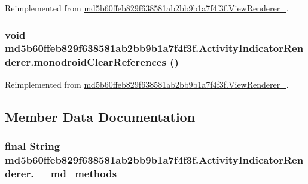 Reimplemented from \hyperlink{classmd5b60ffeb829f638581ab2bb9b1a7f4f3f_1_1_view_renderer__2_64ca8244a89f60a47c173d9c0b15d610}{md5b60ffeb829f638581ab2bb9b1a7f4f3f.ViewRenderer\_}.\hypertarget{classmd5b60ffeb829f638581ab2bb9b1a7f4f3f_1_1_activity_indicator_renderer_53c663b171496cdee3e0eca02ade7e9d}{
\subsubsection[{monodroidClearReferences}]{\setlength{\rightskip}{0pt plus 5cm}void md5b60ffeb829f638581ab2bb9b1a7f4f3f.ActivityIndicatorRenderer.monodroidClearReferences ()}}
\label{classmd5b60ffeb829f638581ab2bb9b1a7f4f3f_1_1_activity_indicator_renderer_53c663b171496cdee3e0eca02ade7e9d}




Reimplemented from \hyperlink{classmd5b60ffeb829f638581ab2bb9b1a7f4f3f_1_1_view_renderer__2_dae20979ac761a65aa60c9b427509c37}{md5b60ffeb829f638581ab2bb9b1a7f4f3f.ViewRenderer\_}.

\subsection{Member Data Documentation}
\hypertarget{classmd5b60ffeb829f638581ab2bb9b1a7f4f3f_1_1_activity_indicator_renderer_b234fd2d3a2a9112481b6ec6f5f98c1d}{
\subsubsection[{\_\-\_\-md\_\-methods}]{\setlength{\rightskip}{0pt plus 5cm}final String {\bf md5b60ffeb829f638581ab2bb9b1a7f4f3f.ActivityIndicatorRenderer.\_\-\_\-md\_\-methods}}}
\label{classmd5b60ffeb829f638581ab2bb9b1a7f4f3f_1_1_activity_indicator_renderer_b234fd2d3a2a9112481b6ec6f5f98c1d}




